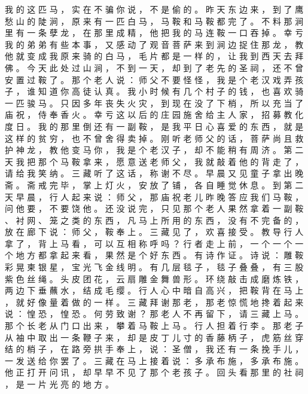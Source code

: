 {我 的 这 匹 马 ， 实 在 不 骗 你 说 ， 不 是 偷 的 。
昨 天 东 边 来 ， 到 了 鹰 愁 山 的 陡 涧 ， 原 来 有 一 匹 白 马 ， 马 鞍 和 马 鞍 都 完 了 。
不 料 那 涧 里 有 一 条 孽 龙 ， 在 那 里 成 精 ， 他 把 我 的 马 连 鞍 一 口 吞 掉 。
幸 亏 我 的 弟 弟 有 些 本 事 ， 又 感 动 了 观 音 菩 萨 来 到 涧 边 捉 住 那 龙 ， 教 他 就 变 成 我 原 来 骑 的 白 马 ， 毛 片 都 是 一 样 的 ， 让 我 到 西 天 去 拜 佛 。
今 天 此 处 过 山 涧 ， 不 到 一 天 ， 却 到 了 老 先 的 圣 祠 ， 还 不 曾 安 置 过 鞍 了 。
那 个 老 人 说 ： 师 父 不 要 怪 怪 ， 我 是 个 老 汉 戏 弄 孩 子 ， 谁 知 道 你 高 徒 认 真 。
我 小 时 候 有 几 个 村 子 的 钱 ， 也 喜 欢 骑 一 匹 骏 马 。
只 因 多 年 丧 失 火 灾 ， 到 现 在 没 了 下 梢 ， 所 以 充 当 了 庙 祝 ， 侍 奉 香 火 。
幸 亏 这 以 后 的 庄 园 施 舍 给 主 人 家 ， 招 募 教 化 度 日 。
我 的 那 里 倒 还 有 一 副 鞍 ， 是 我 平 日 心 喜 爱 的 东 西 ， 就 是 这 样 的 贫 穷 ， 也 不 曾 舍 得 卖 掉 。
刚 听 老 师 父 的 话 ， 菩 萨 尚 且 救 护 神 龙 ， 教 他 变 马 你 ， 我 是 个 老 汉 子 ， 却 不 能 稍 有 周 济 。
第 二 天 我 把 那 个 马 鞍 拿 来 ， 愿 意 送 老 师 父 ， 我 就 敲 着 他 的 背 走 了 ， 请 给 我 笑 纳 。
三 藏 听 了 这 话 ， 称 谢 不 尽 。
早 晨 又 见 童 子 拿 出 晚 斋 。
斋 戒 完 毕 ， 掌 上 灯 火 ， 安 放 了 铺 ， 各 自 睡 觉 休 息 。
到 第 二 天 早 晨 ， 行 人 起 来 说 ： 师 父 ， 那 庙 祝 老 儿 昨 晚 答 应 我 们 马 鞍 ， 问 他 要 ， 不 要 饶 他 。
还 没 说 完 ， 只 见 那 个 老 人 果 然 拿 着 一 副 鞍 、 衬 网 、 笼 之 类 的 东 西 ， 凡 马 上 所 用 的 东 西 ， 没 有 不 完 备 的 ， 放 在 廊 下 说 ： 师 父 ， 鞍 奉 上 。
三 藏 见 了 ， 欢 喜 接 受 。
教 导 行 人 拿 了 ， 背 上 马 看 ， 可 以 互 相 称 呼 吗 ？
行 者 走 上 前 ， 一 个 一 个 一 个 地 方 都 拿 起 来 看 ， 果 然 是 个 好 东 西 。
有 诗 作 证 。
诗 说 ： 雕 鞍 彩 晃 柬 银 星 ， 宝 光 飞 金 线 明 。
有 几 层 毯 子 ， 毯 子 叠 叠 ， 有 三 股 紫 色 丝 绳 。
头 皮 团 花 ， 云 扇 雕 金 舞 兽 形 。
环 绕 敲 击 成 磨 炼 铁 ， 两 边 下 垂 蘸 水 ， 结 成 毛 缨 。
行 人 心 中 暗 自 高 兴 ， 把 鞍 背 在 马 上 ， 就 好 像 量 着 做 的 一 样 。
三 藏 拜 谢 那 老 ， 那 老 惊 慌 地 搀 着 起 来 说 ： 惶 恐 ， 惶 恐 。
何 劳 致 谢 ？ 那 老 人 不 再 留 下 ， 请 三 藏 上 马 。
那 个 长 老 从 门 口 出 来 ， 攀 着 马 鞍 上 马 。
行 人 担 着 行 李 。
那 老 子 从 袖 中 取 出 一 条 鞭 子 来 ， 却 是 皮 丁 儿 寸 的 香 藤 柄 子 ， 虎 筋 丝 穿 结 的 梢 子 ， 在 路 旁 拱 手 奉 上 ， 说 ： 圣 僧 ， 我 还 有 一 条 挽 手 儿 ， 一 发 送 给 你 罢 了 。
三 藏 在 马 上 接 着 说 ： 多 承 布 施 ， 多 承 布 施 。
他 正 打 开 问 讯 ， 却 早 早 不 见 了 那 个 老 孩 子 。
回 头 看 那 里 的 社 祠 ， 是 一 片 光 亮 的 地 方 。
}
